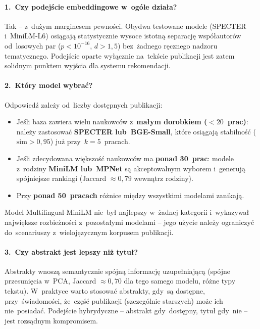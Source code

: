 \paragraph{1.~Czy podejście embeddingowe w~ogóle działa?}

Tak -- z~dużym marginesem pewności.
Obydwa testowane modele (SPECTER i~MiniLM-L6) osiągają
statystycznie wysoce istotną separację współautorów od~losowych par
($p < 10^{-16}$, $d > 1{,}5$) bez~żadnego ręcznego nadzoru tematycznego.
Podejście oparte wyłącznie na~tekście publikacji jest zatem
solidnym punktem wyjścia dla systemu rekomendacji.

\paragraph{2.~Który model wybrać?}

Odpowiedź zależy od~liczby dostępnych publikacji:
\begin{itemize}
    \item Jeśli baza zawiera wielu naukowców z~\textbf{małym dorobkiem
    ($< 20$~prac)}: należy zastosować \textbf{SPECTER lub~BGE-Small},
    które osiągają stabilność ($\mathrm{sim} > 0{,}95$)
    już przy~$k = 5$~pracach.
    \item Jeśli zdecydowana większość naukowców ma
    \textbf{ponad 30~prac}: modele z~rodziny \textbf{MiniLM lub~MPNet}
    są akceptowalnym wyborem i~generują spójniejsze rankingi
    (Jaccard $\approx 0{,}79$ wewnątrz rodziny).
    \item Przy \textbf{ponad 50~pracach} różnice między wszystkimi
    modelami zanikają.
\end{itemize}
Model Multilingual-MiniLM nie~był najlepszy w~żadnej kategorii
i~wykazywał największe rozbieżności z~pozostałymi modelami --
jego użycie należy ograniczyć do~scenariuszy z~wielojęzycznym
korpusem publikacji.

\paragraph{3.~Czy abstrakt jest lepszy niż tytuł?}

Abstrakty wnoszą semantycznie spójną informację uzupełniającą
(spójne przesunięcia w~PCA, Jaccard $\approx 0{,}70$
dla tego samego modelu, różne typy tekstu).
W~praktyce warto stosować abstrakty, gdy~są dostępne,
przy~świadomości, że~część publikacji (szczególnie starszych)
może ich nie~posiadać.
Podejście hybrydyczne -- abstrakt gdy~dostępny, tytuł gdy~nie --
jest rozsądnym kompromisem.

